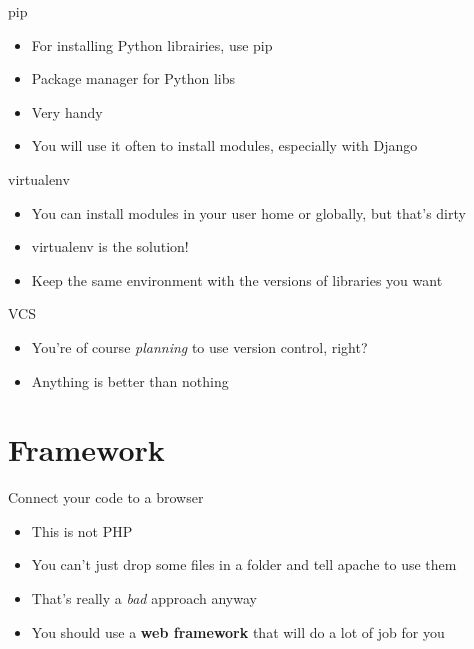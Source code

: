 \documentclass[ignorenonframetext,]{beamer}
\begin{document}
\begin{frame}[fragile]{pip}

\begin{itemize}[<+->]
\itemsep1pt\parskip0pt
\item
  For installing Python librairies, use pip
\item
  Package manager for Python libs
\item
  Very handy
\item
  You will use it often to install modules, especially with Django
\end{itemize}

\end{frame}

\begin{frame}[fragile]{virtualenv}

\begin{itemize}[<+->]
\itemsep1pt\parskip0pt
\item
  You can install modules in your user home or globally, but that's
  dirty
\item
  virtualenv is the solution!
\item
  Keep the same environment with the versions of libraries you want
\end{itemize}

\end{frame}

\begin{frame}[fragile]{VCS}

\begin{itemize}[<+->]
\itemsep1pt\parskip0pt
\item
  You're of course \emph{planning} to use version control, right?
\item
  Anything is better than nothing
\end{itemize}

\end{frame}

\section{Framework}\label{framework}

\begin{frame}[fragile]{Connect your code to a browser}

\begin{itemize}[<+->]
\itemsep1pt\parskip0pt
\item
  This is not PHP
\item
  You can't just drop some files in a folder and tell apache to use them
\item
  That's really a \emph{bad} approach anyway
\item
  You should use a \textbf{web framework} that will do a lot of job for
  you
\end{itemize}

\end{frame}
\end{document}
